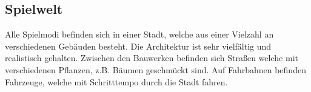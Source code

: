 \subsection{Spielwelt}
Alle Spielmodi befinden sich in einer Stadt, welche aus einer Vielzahl an verschiedenen Gebäuden besteht.
Die Architektur ist sehr vielfältig und realistisch gehalten.
Zwischen den Bauwerken befinden sich Straßen welche mit verschiedenen Pflanzen, z.B. Bäumen geschmückt sind.
Auf Fahrbahnen befinden Fahrzeuge, welche mit Schritttempo durch die Stadt fahren.




%
%
%
%


%
%
